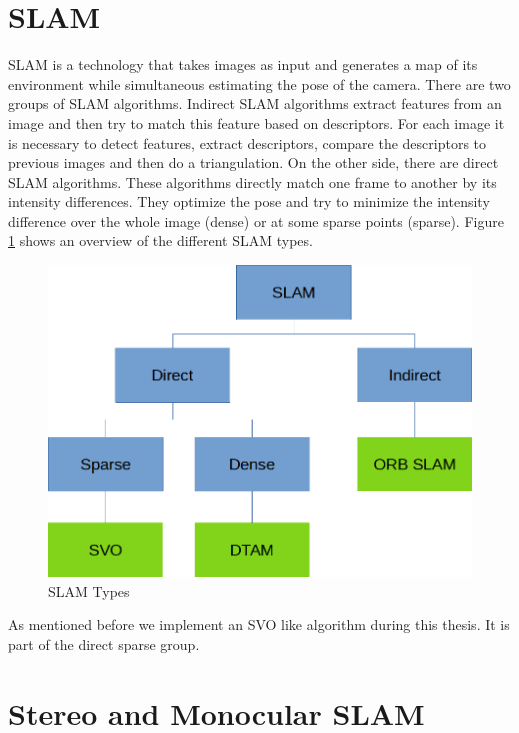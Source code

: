 \documentclass[11pt,a4paper,titlepage,oneside]{report}
\begin{document}
\section{SLAM}

SLAM is a technology that takes images as input and generates a map of its environment while simultaneous estimating the pose of the camera. There are two groups of SLAM algorithms. Indirect SLAM algorithms extract features from an image and then try to match this feature based on descriptors. For each image it is necessary to detect features, extract descriptors, compare the descriptors to previous images and then do a triangulation. On the other side, there are direct SLAM algorithms. These algorithms directly match one frame to another by its intensity differences. They optimize the pose and try to minimize the intensity difference over the whole image (dense) or at some sparse points (sparse). Figure \ref{fig:slammodes} shows an overview of the different SLAM types.

\begin{figure}[H]
  \includegraphics[width=1.0\textwidth]{img/slam_modes.png}
  \caption{SLAM Types}\label{fig:slammodes}
\end{figure}

As mentioned before we implement an SVO like algorithm during this thesis. It is part of the direct sparse group.

\section{Stereo and Monocular SLAM}
\end{document}
